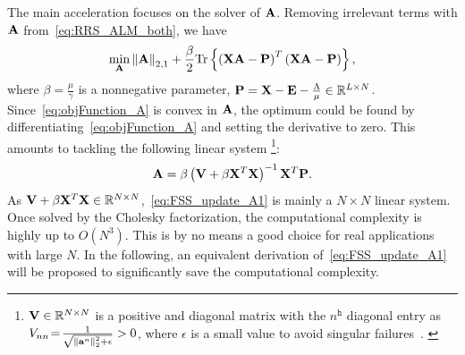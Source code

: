 \documentclass[a4paper]{article}
\begin{document}
The main acceleration focuses on the solver of $\mathbf{A}$. Removing
irrelevant terms with $\mathbf{A}$ from\ \eqref{eq:RRS_ALM_both}, we
have
\begin{equation}
\min_{\mathbf{A}}\left\Vert \mathbf{A}\right\Vert _{2,1}+\frac{\beta}{2}\text{Tr}\left\{ \left(\mathbf{X}\mathbf{A}-\mathbf{P}\right)^{T}\left(\mathbf{X}\mathbf{A}-\mathbf{P}\right)\right\} ,\label{eq:objFunction_A}
\end{equation}
where $\beta=\frac{\mu}{\gamma}$ is a nonnegative parameter, $\mathbf{P}=\mathbf{X}-\mathbf{E}-\frac{\Lambda}{\mu}\in\mathbb{R}^{L\times N}$.
Since\ \eqref{eq:objFunction_A} is convex in $\mathbf{A}$, the optimum
could be found by differentiating\ \eqref{eq:objFunction_A} and
setting the derivative to zero. This amounts to tackling the following
linear system%
\footnote{{\small{$\mathbf{V}\in\mathbb{R}^{N\times N}$ is a positive and diagonal
matrix with the $n^{\mtth}$ diagonal entry as $V_{nn}\!=\!\frac{1}{\sqrt{\left\Vert \mathbf{a}^{n}\right\Vert _{2}^{2}+\epsilon}}>0$,
where $\epsilon$ is a small value to avoid singular failures\ \cite{FpNie_2013_IJCAI_EarlyActiveLearning,fyzhu_2014_JSTSP_RRLbS}. }}%
}: 
\begin{equation}
\mathbf{A}=\beta\left(\mathbf{V}+\beta\mathbf{X}^{T}\mathbf{X}\right)^{-1}\mathbf{X}^{T}\mathbf{P}.\label{eq:FSS_update_A1}
\end{equation}
As $\mathbf{V}+\beta\mathbf{X}^{T}\mathbf{X}\in\mathbb{R}^{N\times N}$,\ \eqref{eq:FSS_update_A1}
is mainly a $N\!\times\! N$ linear system. Once solved by the Cholesky
factorization, the computational complexity is highly up to $O\left(N^{3}\right)$.
This is by no means a good choice for real applications with large
$N$. In the following, an equivalent derivation of\ \eqref{eq:FSS_update_A1}
will be proposed to significantly save the computational complexity. 
\end{document}
